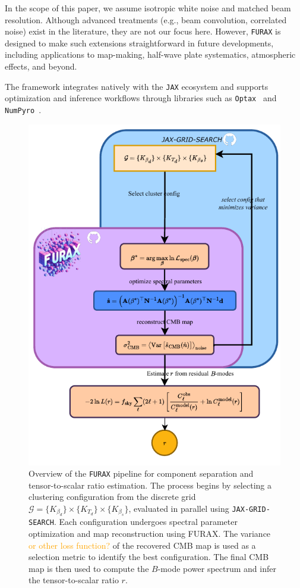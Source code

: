 \documentclass[fleqn,usenatbib]{mnras}
\newcommand{\je}[1]{\textcolor{orange}{#1}}
\begin{document}
In the scope of this paper, we assume isotropic white noise and matched beam resolution. Although advanced treatments (e.g., beam convolution, correlated noise) exist in the literature, they are not our focus here. However, \texttt{FURAX} is designed to make such extensions straightforward in future developments, including applications to map-making, half-wave plate systematics, atmospheric effects, and beyond.

The framework integrates natively with the \texttt{JAX} ecosystem and supports optimization and inference workflows through libraries such as \texttt{Optax}~\citep{optax} and \texttt{NumPyro}~\citep{numpyro}.

\begin{figure}
    \centering
    \includegraphics[width=\linewidth]{figures/FURAX-CS.pdf}
    \caption{
        Overview of the \texttt{FURAX} pipeline for component separation and tensor-to-scalar ratio estimation. The process begins by selecting a clustering configuration from the discrete grid \( \mathcal{G} = \{K_{\beta_d}\} \times \{K_{T_d}\} \times \{K_{\beta_s}\} \), evaluated in parallel using \texttt{JAX-GRID-SEARCH}. Each configuration undergoes spectral parameter optimization and map reconstruction using \textsc{FURAX}. The variance \je{or other loss function?} of the recovered CMB map is used as a selection metric to identify the best configuration. The final CMB map is then used to compute the \( B \)-mode power spectrum and infer the tensor-to-scalar ratio \( r \). 
    }
    \label{fig:furax_pipeline}
\end{figure}
\end{document}
